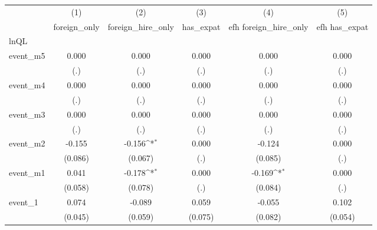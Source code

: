{
\def\sym#1{\ifmmode^{#1}\else\(^{#1}\)\fi}
\begin{tabular}{l*{5}{c}}
\hline\hline
            &\multicolumn{1}{c}{(1)}&\multicolumn{1}{c}{(2)}&\multicolumn{1}{c}{(3)}&\multicolumn{1}{c}{(4)}&\multicolumn{1}{c}{(5)}\\
            &\multicolumn{1}{c}{foreign\_only}&\multicolumn{1}{c}{foreign\_hire\_only}&\multicolumn{1}{c}{has\_expat}&\multicolumn{1}{c}{efh foreign\_hire\_only}&\multicolumn{1}{c}{efh has\_expat}\\
\hline
lnQL        &                     &                     &                     &                     &                     \\
event\_m5    &       0.000         &       0.000         &       0.000         &       0.000         &       0.000         \\
            &         (.)         &         (.)         &         (.)         &         (.)         &         (.)         \\
[1em]
event\_m4    &       0.000         &       0.000         &       0.000         &       0.000         &       0.000         \\
            &         (.)         &         (.)         &         (.)         &         (.)         &         (.)         \\
[1em]
event\_m3    &       0.000         &       0.000         &       0.000         &       0.000         &       0.000         \\
            &         (.)         &         (.)         &         (.)         &         (.)         &         (.)         \\
[1em]
event\_m2    &      -0.155         &      -0.156\sym{*}  &       0.000         &      -0.124         &       0.000         \\
            &     (0.086)         &     (0.067)         &         (.)         &     (0.085)         &         (.)         \\
[1em]
event\_m1    &       0.041         &      -0.178\sym{*}  &       0.000         &      -0.169\sym{*}  &       0.000         \\
            &     (0.058)         &     (0.078)         &         (.)         &     (0.084)         &         (.)         \\
[1em]
event\_1     &       0.074         &      -0.089         &       0.059         &      -0.055         &       0.102         \\
            &     (0.045)         &     (0.059)         &     (0.075)         &     (0.082)         &     (0.054)         \\

\end{tabular}}

